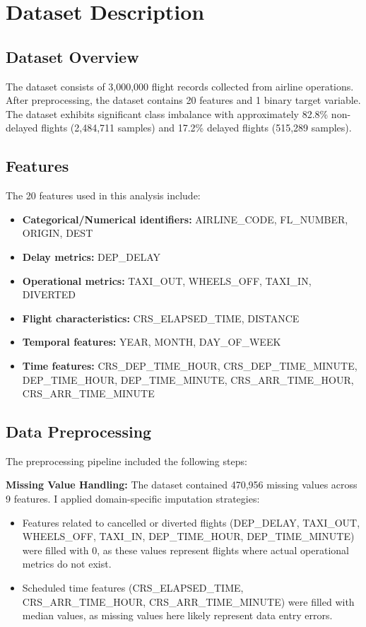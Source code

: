 \documentclass[sigconf]{acmart}
\begin{document}
\section{Dataset Description}

\subsection{Dataset Overview}
The dataset consists of 3,000,000 flight records collected from airline operations. After preprocessing, the dataset contains 20 features and 1 binary target variable. The dataset exhibits significant class imbalance with approximately 82.8\% non-delayed flights (2,484,711 samples) and 17.2\% delayed flights (515,289 samples).

\subsection{Features}
The 20 features used in this analysis include:
\begin{itemize}
    \item \textbf{Categorical/Numerical identifiers:} AIRLINE\_CODE, FL\_NUMBER, ORIGIN, DEST
    \item \textbf{Delay metrics:} DEP\_DELAY
    \item \textbf{Operational metrics:} TAXI\_OUT, WHEELS\_OFF, TAXI\_IN, DIVERTED
    \item \textbf{Flight characteristics:} CRS\_ELAPSED\_TIME, DISTANCE
    \item \textbf{Temporal features:} YEAR, MONTH, DAY\_OF\_WEEK
    \item \textbf{Time features:} CRS\_DEP\_TIME\_HOUR, CRS\_DEP\_TIME\_MINUTE, DEP\_TIME\_HOUR, DEP\_TIME\_MINUTE, CRS\_ARR\_TIME\_HOUR, CRS\_ARR\_TIME\_MINUTE
\end{itemize}

\subsection{Data Preprocessing}
The preprocessing pipeline included the following steps:

\textbf{Missing Value Handling:} The dataset contained 470,956 missing values across 9 features. I applied domain-specific imputation strategies:
\begin{itemize}
    \item Features related to cancelled or diverted flights (DEP\_DELAY, TAXI\_OUT, WHEELS\_OFF, TAXI\_IN, DEP\_TIME\_HOUR, DEP\_TIME\_MINUTE) were filled with 0, as these values represent flights where actual operational metrics do not exist.
    \item Scheduled time features (CRS\_ELAPSED\_TIME, CRS\_ARR\_TIME\_HOUR, CRS\_ARR\_TIME\_MINUTE) were filled with median values, as missing values here likely represent data entry errors.
\end{itemize}
\end{document}
